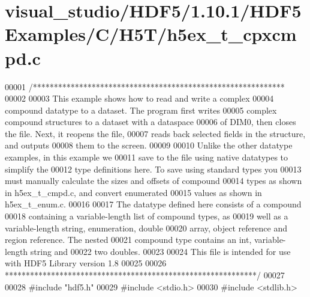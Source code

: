 \hypertarget{visual__studio_2_h_d_f5_21_810_81_2_h_d_f5_examples_2_c_2_h5_t_2h5ex__t__cpxcmpd_8c_source}{}\section{visual\+\_\+studio/\+H\+D\+F5/1.10.1/\+H\+D\+F5\+Examples/\+C/\+H5\+T/h5ex\+\_\+t\+\_\+cpxcmpd.c}
\label{visual__studio_2_h_d_f5_21_810_81_2_h_d_f5_examples_2_c_2_h5_t_2h5ex__t__cpxcmpd_8c_source}

\begin{DoxyCode}
00001 \textcolor{comment}{/************************************************************}
00002 \textcolor{comment}{}
00003 \textcolor{comment}{  This example shows how to read and write a complex}
00004 \textcolor{comment}{  compound datatype to a dataset.  The program first writes}
00005 \textcolor{comment}{  complex compound structures to a dataset with a dataspace}
00006 \textcolor{comment}{  of DIM0, then closes the file.  Next, it reopens the file,}
00007 \textcolor{comment}{  reads back selected fields in the structure, and outputs}
00008 \textcolor{comment}{  them to the screen.}
00009 \textcolor{comment}{}
00010 \textcolor{comment}{  Unlike the other datatype examples, in this example we}
00011 \textcolor{comment}{  save to the file using native datatypes to simplify the}
00012 \textcolor{comment}{  type definitions here.  To save using standard types you}
00013 \textcolor{comment}{  must manually calculate the sizes and offsets of compound}
00014 \textcolor{comment}{  types as shown in h5ex\_t\_cmpd.c, and convert enumerated}
00015 \textcolor{comment}{  values as shown in h5ex\_t\_enum.c.}
00016 \textcolor{comment}{}
00017 \textcolor{comment}{  The datatype defined here consists of a compound}
00018 \textcolor{comment}{  containing a variable-length list of compound types, as}
00019 \textcolor{comment}{  well as a variable-length string, enumeration, double}
00020 \textcolor{comment}{  array, object reference and region reference.  The nested}
00021 \textcolor{comment}{  compound type contains an int, variable-length string and}
00022 \textcolor{comment}{  two doubles.}
00023 \textcolor{comment}{}
00024 \textcolor{comment}{  This file is intended for use with HDF5 Library version 1.8}
00025 \textcolor{comment}{}
00026 \textcolor{comment}{ ************************************************************/}
00027 
00028 \textcolor{preprocessor}{#include "hdf5.h"}
00029 \textcolor{preprocessor}{#include <stdio.h>}
00030 \textcolor{preprocessor}{#include <stdlib.h>}

\end{DoxyCode}
